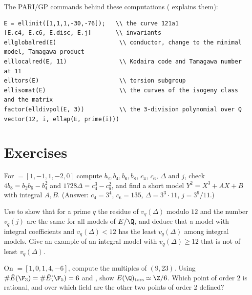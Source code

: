 The PARI/GP commands behind these computations ( explains them):
\begin{lstlisting}[language=GP]
E = ellinit([1,1,1,-30,-76]);   \\ the curve 121a1
[E.c4, E.c6, E.disc, E.j]       \\ invariants
ellglobalred(E)                  \\ conductor, change to the minimal model, Tamagawa product
elllocalred(E, 11)               \\ Kodaira code and Tamagawa number at 11
elltors(E)                       \\ torsion subgroup
ellisomat(E)                     \\ the curves of the isogeny class and the matrix
factor(elldivpol(E, 3))          \\ the 3-division polynomial over Q
vector(12, i, ellap(E, prime(i)))
\end{lstlisting}

\section{Exercises}\label{sec:ellcurves:exercises}

\begin{exercise}\label{ex:ellcurves:ex-99a1}
For  $=[1,-1,1,-2,0]$ compute $b_2,b_4,b_6,b_8$, $c_4$, $c_6$, $\Delta$ and $j$, check $4b_8=b_2b_6-b_4^2$ and $1728\Delta=c_4^3-c_6^2$, and find a short model $Y^2=X^3+AX+B$ with integral
$A,B$. (Answer: $c_4=3^4$, $c_6=135$, $\Delta=3^3\cdot11$, $j=3^9/11$.)
\end{exercise}

\begin{exercise}\label{ex:ellcurves:ex-valuations}
Use  to show that for a prime $q$ the residue of $v_q(\Delta)$ modulo $12$ and the number $v_q(j)$ are the same for all models of $E/\Q$, and deduce that a model with
integral coefficients and $v_q(\Delta)<12$ has the least $v_q(\Delta)$ among integral models. Give an example of an integral model with $v_q(\Delta)\ge12$ that is not of least $v_q(\Delta)$.
\end{exercise}

\begin{exercise}\label{ex:ellcurves:ex-14a1}
On  $=[1,0,1,4,-6]$, compute the multiples of $(9,23)$. Using $\#\tilde E(\F_3)=\#\tilde E(\F_5)=6$ and , show $E(\Q)_{\mathrm{tors}}\simeq\Z/6$. Which point of
order $2$ is rational, and over which field are the other two points of order $2$ defined?
\end{exercise}

